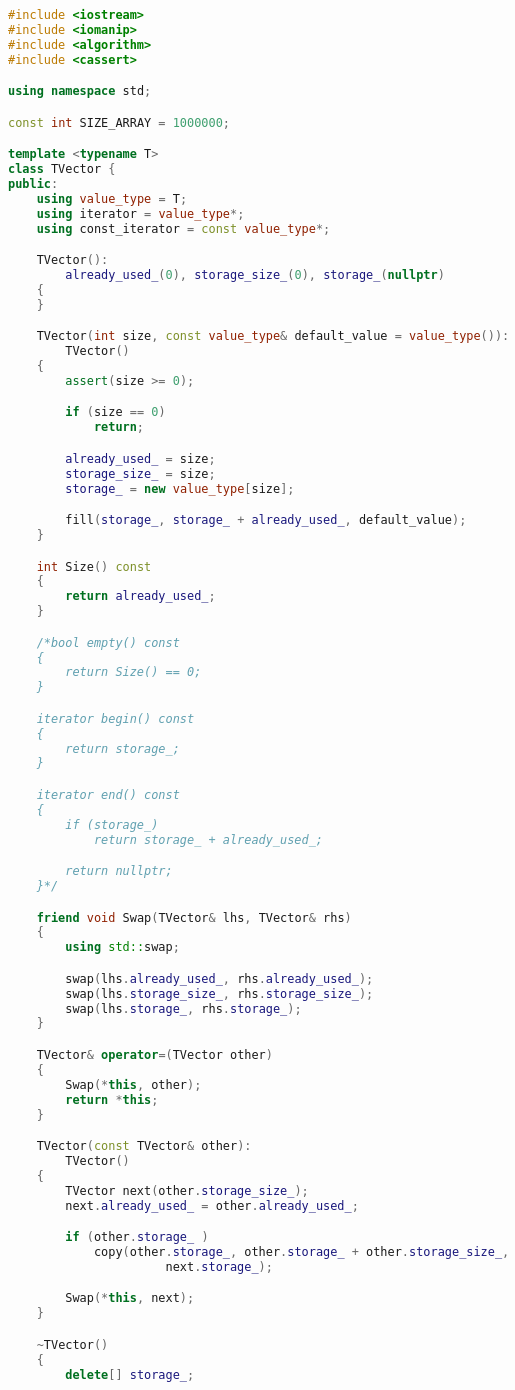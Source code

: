\documentclass{article}
\begin{document}
\begin{lstlisting}[language=C++]
#include <iostream>
#include <iomanip>
#include <algorithm>
#include <cassert>

using namespace std;

const int SIZE_ARRAY = 1000000;

template <typename T>
class TVector {
public:
    using value_type = T;
    using iterator = value_type*;
    using const_iterator = const value_type*;

    TVector():
        already_used_(0), storage_size_(0), storage_(nullptr)
    {
    }

    TVector(int size, const value_type& default_value = value_type()):
        TVector()
    {
        assert(size >= 0);

        if (size == 0)
            return;

        already_used_ = size;
        storage_size_ = size;
        storage_ = new value_type[size];

        fill(storage_, storage_ + already_used_, default_value);
    }

    int Size() const
    {
        return already_used_;
    }

    /*bool empty() const
    {
        return Size() == 0;
    }

    iterator begin() const
    {
        return storage_;
    }

    iterator end() const
    {
        if (storage_)
            return storage_ + already_used_;

        return nullptr;
    }*/

    friend void Swap(TVector& lhs, TVector& rhs)
    {
        using std::swap;

        swap(lhs.already_used_, rhs.already_used_);
        swap(lhs.storage_size_, rhs.storage_size_);
        swap(lhs.storage_, rhs.storage_);
    }

    TVector& operator=(TVector other)
    {
        Swap(*this, other);
        return *this;
    }

    TVector(const TVector& other):
        TVector()
    {
        TVector next(other.storage_size_);
        next.already_used_ = other.already_used_;

        if (other.storage_ )
            copy(other.storage_, other.storage_ + other.storage_size_,
                      next.storage_);

        Swap(*this, next);
    }

    ~TVector()
    {
        delete[] storage_;


\end{lstlisting}
\end{document}
